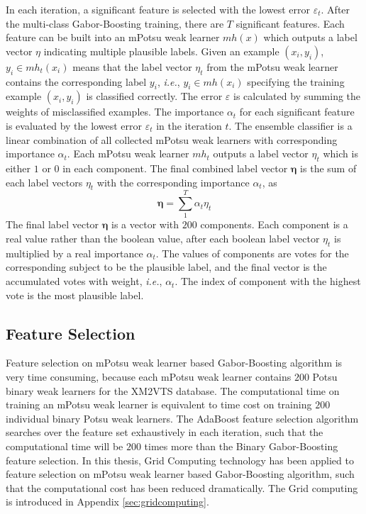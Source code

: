 In each iteration, a significant feature is selected with the lowest error $\varepsilon_{t}$. After the multi-class Gabor-Boosting training, there are $T$ significant features. Each feature can be built into an mPotsu weak learner $mh(x)$ which outputs a label vector $\eta$ indicating multiple plausible labels. Given an example $(x_i,y_i)$, $y_i \in mh_t(x_i)$ means that the label vector $\eta_t$ from the mPotsu weak learner contains the corresponding label $y_i$,\textit{ i.e.}, $y_i \in mh(x_i)$ specifying the training example $(x_i,y_i)$ is classified correctly. The error $\varepsilon$ is calculated by summing the weights of misclassified examples. The importance $\alpha_t$ for each significant feature is evaluated by the lowest error $\varepsilon_t$ in the iteration $t$. The ensemble classifier is a linear combination of all collected mPotsu weak learners with corresponding importance $\alpha_t$. Each mPotsu weak learner $mh_t$ outputs a label vector $\eta_t$ which is either $1$ or $0$ in each component. The final combined label vector $\boldsymbol{\eta}$ is the sum of each label vectors $\eta_t$ with the corresponding importance $\alpha_t$, as 
\begin{equation}
\boldsymbol{\eta} = \sum_1^T \alpha_t \eta_t
\end{equation}
The final label vector $\boldsymbol{\eta}$ is a vector with $200$ components. Each component is a real value rather than the boolean value, after each boolean label vector $\eta_t$ is multiplied by a real importance $\alpha_t$. The values of components are votes for the corresponding subject to be the plausible label, and the final vector is the accumulated votes with weight,\textit{ i.e.}, $\alpha_t$. The index of component with the highest vote is the most plausible label.

\subsection{Feature Selection}\label{sec:multifeatureselection}
Feature selection on mPotsu weak learner based Gabor-Boosting algorithm is very time consuming, because each mPotsu weak learner contains $200$ Potsu binary weak learners for the \mbox{XM2VTS} database. The computational time on training an mPotsu weak learner is equivalent to time cost on training $200$ individual binary Potsu weak learners. The AdaBoost feature selection algorithm searches over the feature set exhaustively in each iteration, such that the computational time will be $200$ times more than the Binary Gabor-Boosting feature selection. In this thesis, Grid Computing technology has been applied to feature selection on mPotsu weak learner based Gabor-Boosting algorithm, such that the computational cost has been reduced dramatically. The Grid computing is introduced in \mbox{Appendix} \ref{sec:gridcomputing}.

